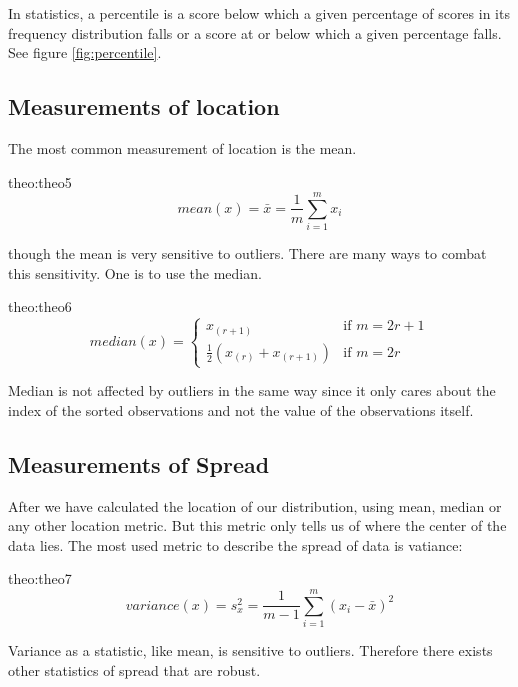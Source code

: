 In statistics, a percentile is a score below which a given percentage of scores 
in its frequency distribution falls or a score at or below which a given 
percentage falls. See figure \ref{fig:percentile}.

\subsection{Measurements of location}

The most common measurement of location is the mean.

\begin{theo}[Mean]{theo:theo5}
    \label{eq:mean}
        \[
            mean(x) = \bar{x} = \frac{1}{m}\sum_{i=1}^m x_i
        \]
\end{theo}

though the mean is very sensitive to outliers. There are many ways to combat
this sensitivity. One is to use the median.

\begin{theo}[Median]{theo:theo6}
    \label{eq:median}
        \[
            median(x) = 
            \left\{\begin{matrix}
                x_{(r+1)} & \text{if } m=2r+1 \\ 
                \frac{1}{2} \left( x_{(r)} + x_{(r+1)} \right)  & \text{if } m=2r
            \end{matrix}\right.
        \]
\end{theo}

Median is not affected by outliers in the same way since it only cares about the
index of the sorted observations and not the value of the observations itself. 

\subsection{Measurements of Spread}

After we have calculated the location of our distribution, using mean, median or
any other location metric. But this metric only tells us of where the center of
the data lies. The most used metric to describe the spread of data is vatiance:

\begin{theo}[Variance]{theo:theo7}
    \label{eq:variance}
        \[
            variance(x) = s_x^2 = \frac{1}{m-1} \sum_{i=1}^m(x_i-\bar{x})^2
        \]
\end{theo}

Variance as a statistic, like mean, is sensitive to outliers. Therefore there
exists other statistics of spread that are robust.

